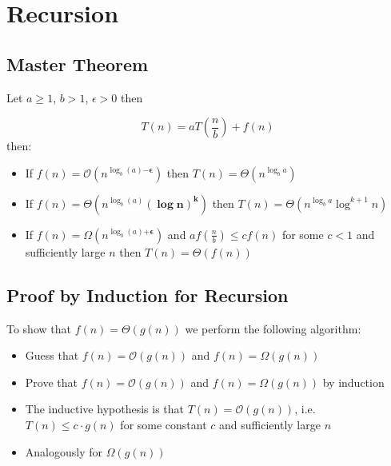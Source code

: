 \section{Recursion}
\subsection{Master Theorem}

Let \( a \geq 1 \), \( b > 1 \), \( \epsilon > 0 \) then

\begin{equation*}
    T(n) = a T \left( \frac{n}{b} \right) + f(n)
\end{equation*}
then:
\begin{itemize}
    \item  If \( f(n) = \mathcal{O} \left( n^{\log_b (a) \bm{ - \epsilon}} \right) \) then \( T(n) = \Theta \left( n^{\log_b a} \right) \)
    \item If \( f(n) = \Theta \left( n^{\log_b (a)} \bm{\left(\log n \right)^k} \right) \) then \( T(n) = \Theta \left( n^{\log_b a} \log^{k+1} n \right) \) 
    \item If \( f(n) = \Omega \left( n^{\log_b (a) 
 \bm{+ \epsilon}} \right) \) and \( a f \left( \frac{n}{b} \right) \leq c f(n) \) for some \( c < 1 \) and sufficiently large \( n \) then \( T(n) = \Theta \left( f \left(n \right) \right) \)
\end{itemize}

\subsection{Proof by Induction for Recursion}
To show that \(f \left( n \right)  = \Theta \left( g \left( n \right) \right) \) we perform the following algorithm: 
\begin{itemize}
    \item Guess that \( f \left( n \right) = \mathcal{O} \left( g \left( n \right) \right) \) and \( f \left( n \right) = \Omega \left( g \left( n \right) \right) \)
    \item Prove that \( f \left( n \right) = \mathcal{O} \left( g \left( n \right) \right) \) and \( f \left( n \right) = \Omega \left( g \left( n \right) \right) \) by induction
    \item The inductive hypothesis is that \( T \left( n \right) = \mathcal{O} \left( g \left( n \right)  \right) \), i.e. \( T \left( n \right) \leq c \cdot g \left( n \right)\)  for some constant \( c \)  and sufficiently large \( n \)
    \item Analogously for \( \Omega \left( g \left( n \right) \right) \)
\end{itemize}


